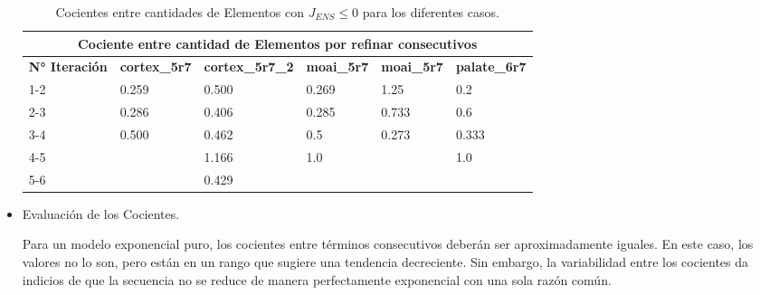 \begin{itemize}
	\begin{table}[!ht]
	\begin{tabular}{|llllll|}
	\hline
	\multicolumn{6}{|c|}{ Cociente entre cantidad de Elementos por refinar consecutivos}                                                                                                                                                                           \\ \hline
	\multicolumn{1}{|l|}{\textbf{N° Iteración}} & \multicolumn{1}{l|}{\textbf{cortex\_5r7}} & \multicolumn{1}{l|}{\textbf{cortex\_5r7\_2}} & \multicolumn{1}{l|}{\textbf{moai\_5r7}} & \multicolumn{1}{l|}{\textbf{moai\_5r7}} & \textbf{palate\_6r7} \\ \hline
	\multicolumn{1}{|l|}{1-2}                   & \multicolumn{1}{l|}{0.259}          & \multicolumn{1}{l|}{0.500}             & \multicolumn{1}{l|}{0.269}         & \multicolumn{1}{l|}{1.25}         & 0.2             \\ \hline
	\multicolumn{1}{|l|}{2-3}                   & \multicolumn{1}{l|}{0.286}            & \multicolumn{1}{l|}{0.406}             & \multicolumn{1}{l|}{0.285}          & \multicolumn{1}{l|}{0.733}        & 0.6              \\ \hline
	\multicolumn{1}{|l|}{3-4}                   & \multicolumn{1}{l|}{0.500}            & \multicolumn{1}{l|}{0.462}              & \multicolumn{1}{l|}{0.5}            & \multicolumn{1}{l|}{0.273}         & 0.333            \\ \hline
	\multicolumn{1}{|l|}{4-5}                   & \multicolumn{1}{l|}{}                     & \multicolumn{1}{l|}{1.166}               & \multicolumn{1}{l|}{1.0}            & \multicolumn{1}{l|}{}                   & 1.0              \\ \hline
	\multicolumn{1}{|l|}{5-6}                   & \multicolumn{1}{l|}{}                     & \multicolumn{1}{l|}{0.429}               & \multicolumn{1}{l|}{}                   & \multicolumn{1}{l|}{}                   &                      \\ \hline
	\end{tabular}
	\caption{Cocientes entre cantidades de Elementos con $J_{ENS} \leq 0$ para los diferentes casos. }
	\label{table:co_els_ref}
	\end{table}


    \item Evaluación de los Cocientes.

    Para un modelo exponencial puro, los cocientes entre términos consecutivos deberán ser aproximadamente iguales. En este caso, los valores no lo son, pero están en un rango que sugiere una tendencia decreciente. Sin embargo, la variabilidad entre los cocientes da indicios de que la secuencia no se reduce de manera perfectamente exponencial con una sola razón común.


\end{itemize}
